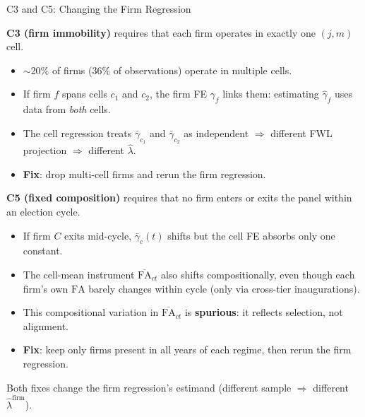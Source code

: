 \documentclass[aspectratio=169,11pt]{beamer}
\newcommand{\FA}{\mathrm{FA}}
\begin{document}
\begin{frame}{C3 and C5: Changing the Firm Regression}

\footnotesize
\textbf{C3 (firm immobility)} requires that each firm operates in exactly one $(j, m)$ cell.

\begin{itemize}\setlength{\itemsep}{2pt}
  \item $\sim$20\% of firms (36\% of observations) operate in multiple cells.
  \item If firm $f$ spans cells $c_1$ and $c_2$, the firm FE $\gamma_f$ links them: estimating $\hat\gamma_f$ uses data from \emph{both} cells.
  \item The cell regression treats $\bar\gamma_{c_1}$ and $\bar\gamma_{c_2}$ as independent $\Rightarrow$ different FWL projection $\Rightarrow$ different $\hat\lambda$.
  \item \textbf{Fix}: drop multi-cell firms and rerun the firm regression.
\end{itemize}

\medskip
\textbf{C5 (fixed composition)} requires that no firm enters or exits the panel within an election cycle.

\begin{itemize}\setlength{\itemsep}{2pt}
  \item If firm $C$ exits mid-cycle, $\bar\gamma_c(t)$ shifts but the cell FE absorbs only one constant.
  \item The cell-mean instrument $\overline{\FA}_{ct}$ also shifts compositionally, even though each firm's own $\FA$ barely changes within cycle (only via cross-tier inaugurations).
  \item This compositional variation in $\overline{\FA}_{ct}$ is \textbf{spurious}: it reflects selection, not alignment.
  \item \textbf{Fix}: keep only firms present in all years of each regime, then rerun the firm regression.
\end{itemize}

\medskip
Both fixes change the firm regression's estimand (different sample $\Rightarrow$ different $\hat\lambda^\mathrm{firm}$).

\end{frame}
\end{document}
